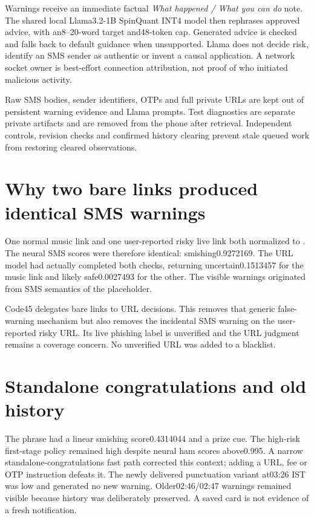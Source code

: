 Warnings receive an immediate factual \emph{What happened / What you can do} note. The shared local Llama3.2-1B SpinQuant INT4 model then rephrases approved advice, with an8--20-word target and48-token cap. Generated advice is checked and falls back to default guidance when unsupported. Llama does not decide risk, identify an SMS sender as authentic or invent a causal application. A network socket owner is best-effort connection attribution, not proof of who initiated malicious activity.

Raw SMS bodies, sender identifiers, OTPs and full private URLs are kept out of persistent warning evidence and Llama prompts. Test diagnostics are separate private artifacts and are removed from the phone after retrieval. Independent controls, revision checks and confirmed history clearing prevent stale queued work from restoring cleared observations.

\section{Why two bare links produced identical SMS warnings}
One normal music link and one user-reported risky live link both normalized to . The neural SMS scores were therefore identical: smishing0.9272169. The URL model had actually completed both checks, returning uncertain0.1513457 for the music link and likely safe0.0027493 for the other. The visible warnings originated from SMS semantics of the placeholder.

Code45 delegates bare links to URL decisions. This removes that generic false-warning mechanism but also removes the incidental SMS warning on the user-reported risky URL. Its live phishing label is unverified and the URL judgment remains a coverage concern. No unverified URL was added to a blacklist.

\section{Standalone congratulations and old history}
The phrase  had a linear smishing score0.4314044 and a prize cue. The high-risk first-stage policy remained high despite neural ham scores above0.995. A narrow standalone-congratulations fast path corrected this context; adding a URL, fee or OTP instruction defeats it. The newly delivered punctuation variant at03:26 IST was low and generated no new warning. Older02:46/02:47 warnings remained visible because history was deliberately preserved. A saved card is not evidence of a fresh notification.

